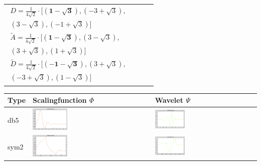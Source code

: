 \begin{tabular}{l||m{}|m{}|m{}}
\begin{align}
		D = \frac{1}{4\sqrt{2}} \cdot [\mathbf{(1-\sqrt{3})}, (-3+\sqrt{3}),  \nonumber\\
		(3-\sqrt{3}), (-1+\sqrt{3})] \nonumber\\
		\tilde{A} = \frac{1}{4\sqrt{2}} \cdot [\mathbf{(1-\sqrt{3})}, (3-\sqrt{3}),  \nonumber\\
		(3+\sqrt{3}), (1+\sqrt{3})] \nonumber\\
		\tilde{D} = \frac{1}{4\sqrt{2}} \cdot [\mathbf{(-1-\sqrt{3})}, (3+\sqrt{3}),  \nonumber\\
		(-3+\sqrt{3}), (1-\sqrt{3})] \nonumber
	\end{align} \\
\end{tabular}
\renewcommand{\arraystretch}{1}

\begin{center}
	\begin{tabular}{l||m{}|m{}}
		Type & Scalingfunction $\Phi$ & Wavelet $\Psi$ \\
		\hline
		db5 &
		\includegraphics[width=0.3\textwidth]{content/Db5Phi.png} &
		\includegraphics[width=0.3\textwidth]{content/Db5Psi.png} \\
		sym2 & 
		\includegraphics[width=0.3\textwidth]{content/Sym2Phi.png} &
		\includegraphics[width=0.3\textwidth]{content/Sym2Psi.png} \\

\end{tabular}
\end{center}
